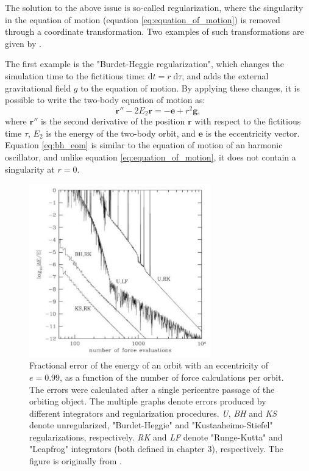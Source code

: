 \documentclass[english, oneside]{HYgradu}
\begin{document}
The solution to the above issue is so-called regularization, where the singularity in the equation of motion (equation \ref{eq:equation_of_motion}) is removed through a coordinate transformation. Two examples of such transformations are given by \cite{BinneyTremaine}. 

The first example is the "Burdet-Heggie regularization", which changes the simulation time to the fictitious time: $\mathrm{d}t = r \; \mathrm{d}\tau$, and adds the external gravitational field $g$ to the equation of motion. By applying these changes, it is possible to write the two-body equation of motion as:
\begin{equation}
\mathbf{r}'' - 2E_2\mathbf{r} = - \mathbf{e}+r^2\mathbf{g}, \label{eq:bh_eom}
\end{equation}
where $\mathbf{r}''$ is the second derivative of the position $\mathbf{r}$ with respect to the fictitious time $\tau$, $E_2$ is the energy of the two-body orbit, and $\mathbf{e}$ is the eccentricity vector. Equation \ref{eq:bh_eom} is similar to the equation of motion of an harmonic oscillator, and unlike equation \ref{eq:equation_of_motion}, it does not contain a singularity at $r=0$.

\begin{figure}
	\centering
	\includegraphics[width=0.7\textwidth]{binneytremaine_pic.png}
	\caption{Fractional error of the energy of an orbit with an eccentricity of $e=0.99$, as a function of the number of force calculations per orbit. The errors were calculated after a single pericentre passage of the orbiting object. The multiple graphs denote errors produced by different integrators and regularization procedures. \textit{U}, \textit{BH} and \textit{KS} denote unregularized, "Burdet-Heggie" and "Kustaaheimo-Stiefel" regularizations, respectively. \textit{RK} and \textit{LF} denote "Runge-Kutta" and "Leapfrog" integrators (both defined in chapter 3), respectively. The figure is originally from \cite{BinneyTremaine}.}
	\label{figure:regularized}
\end{figure}
\end{document}
